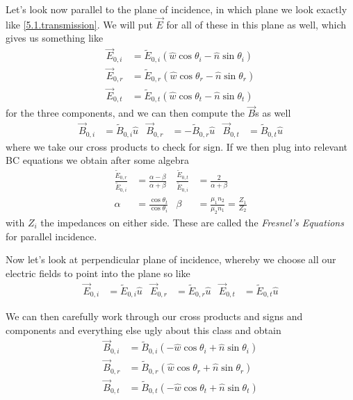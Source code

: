\documentclass[10pt]{report}
\begin{document}
Let's look now parallel to the plane of incidence, in which plane we look exactly like \ref{5.1.transmission}. We will put $\vec{E}$ for all of these in this plane as well, which gives us something like
\begin{align}
    \vec{E}_{0,i} &= \tilde{E}_{0,i}\left( \hat{w} \cos \theta_i - \hat{n}\sin \theta_i \right)\\
    \vec{E}_{0,r} &= \tilde{E}_{0,r}\left( \hat{w} \cos \theta_r - \hat{n}\sin \theta_r \right)\\
    \vec{E}_{0,t} &= \tilde{E}_{0,t}\left( \hat{w} \cos \theta_t - \hat{n}\sin \theta_t \right)
\end{align}
for the three components, and we can then compute the $\vec{B}$s as well
\begin{align}
    \vec{B}_{0,i} &= \tilde{B}_{0,i}\hat{u} &
    \vec{B}_{0,r} &= -\tilde{B}_{0,r}\hat{u} &
    \vec{B}_{0,t} &= \tilde{B}_{0,t}\hat{u}
\end{align}
where we take our cross products to check for sign. If we then plug into relevant BC equations we obtain after some algebra
\begin{align}
    \frac{\tilde{E}_{0,r}}{\tilde{E}_{0,i}} &= \frac{\alpha - \beta}{\alpha + \beta} & \frac{\tilde{E}_{0,t}}{\tilde{E}_{0,i}} &= \frac{2}{\alpha + \beta}\\
    \alpha &= \frac{\cos \theta_t}{\cos \theta_i} & \beta &= \frac{\mu_1 n_2}{\mu_2n_1} = \frac{Z_1}{Z_2}
\end{align}
with $Z_i$ the impedances on either side. These are called the \emph{Fresnel's Equations} for parallel incidence.

Now let's look at perpendicular plane of incidence, whereby we choose all our electric fields to point into the plane so like
\begin{align}
    \vec{E}_{0,i} &= \tilde{E}_{0,i}\hat{u} &
    \vec{E}_{0,r} &= \tilde{E}_{0,r}\hat{u} &
    \vec{E}_{0,t} &= \tilde{E}_{0,t}\hat{u}
\end{align}

We can then carefully work through our cross products and signs and components and everything else ugly about this class and obtain
\begin{align}
    \vec{B}_{0,i} &= \tilde{B}_{0,i}\left( -\hat{w}\cos\theta_i + \hat{n}\sin\theta_i \right)\\
    \vec{B}_{0,r} &= \tilde{B}_{0,r}\left( \hat{w}\cos\theta_r + \hat{n}\sin\theta_r \right)\\
    \vec{B}_{0,t} &= \tilde{B}_{0,t}\left( -\hat{w}\cos\theta_t + \hat{n}\sin\theta_t \right)
\end{align}
\end{document}
